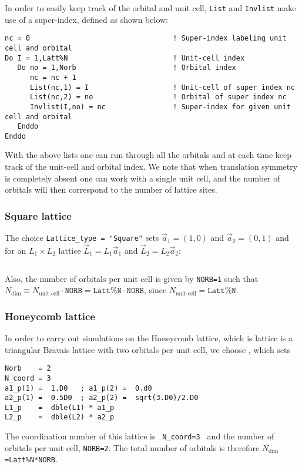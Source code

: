 In order to easily keep track of the orbital and unit cell, \texttt{List} and \texttt{Invlist} make use of a super-index, defined as shown below:
\begin{lstlisting}[style=fortran]
nc = 0                                  ! Super-index labeling unit cell and orbital
Do I = 1,Latt%N                         ! Unit-cell index 
   Do no = 1,Norb                       ! Orbital index
      nc = nc + 1
      List(nc,1) = I                    ! Unit-cell of super index nc
      List(nc,2) = no                   ! Orbital of super index nc
      Invlist(I,no) = nc                ! Super-index for given unit cell and orbital
   Enddo
Enddo
\end{lstlisting}
With the above lists one can run through all the orbitals and at each time keep track of the unit-cell and orbital index. We note that when translation symmetry is completely absent one can work with a single unit cell, and the number of orbitals will then correspond to the number of lattice sites. 

\subsubsection{Square lattice}

The choice \texttt{Lattice\_type = "Square"} sets $\vec{a}_1 =  (1,0) $ and $\vec{a}_2 =  (0,1) $  and for an $L_1 \times L_2$  lattice  $\vec{L}_1 = L_1 \vec{a}_1$ and  $\vec{L}_2 = L_2 \vec{a}_2$:
\begin{lstlisting}[style=fortran]

\end{lstlisting}
Also, the number of orbitals per unit cell is given by \texttt{NORB=1} such that   $N_{\mathrm{dim}}   \equiv N_{\text{unit-cell}}   \cdot \texttt{NORB}  = \texttt{Latt\%N} \cdot \texttt{NORB}$, since $N_{\text{unit-cell}} = \texttt{Latt\%N}$.

\subsubsection{Honeycomb lattice}

In order to carry out simulations on the Honeycomb lattice, which is lattice is a triangular Bravais lattice with two orbitals per unit cell, we choose , which sets
\begin{lstlisting}[style=fortran]
Norb    = 2
N_coord = 3
a1_p(1) =  1.D0   ; a1_p(2) =  0.d0
a2_p(1) =  0.5D0  ; a2_p(2) =  sqrt(3.D0)/2.D0             
L1_p    =  dble(L1) * a1_p
L2_p    =  dble(L2) * a2_p
\end{lstlisting}
The coordination number of this lattice is \texttt{ N\_coord=3 }  and  the number of orbitals per unit cell, \texttt{NORB=2}. The total number of orbitals is therefore \texttt{$N_{\mathrm{dim}}$=Latt\%N*NORB}.


